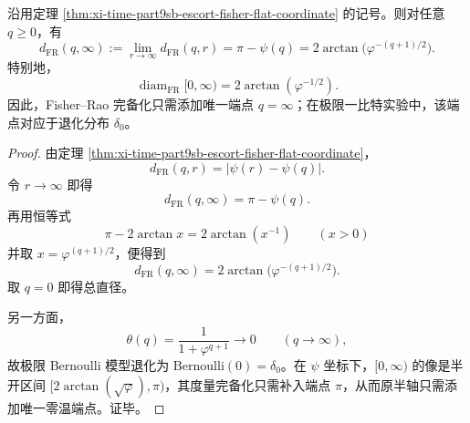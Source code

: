 \begin{corollary}\label{cor:xi-time-part9sb-escort-fisher-completion-zero-endpoint}
沿用定理 \ref{thm:xi-time-part9sb-escort-fisher-flat-coordinate} 的记号。则对任意 \(q\ge 0\)，有
\[
d_{\mathrm{FR}}(q,\infty)
:=
\lim_{r\to\infty}d_{\mathrm{FR}}(q,r)
=
\pi-\psi(q)
=
2\arctan\!\bigl(\varphi^{-(q+1)/2}\bigr).
\]
特别地，
\[
\operatorname{diam}_{\mathrm{FR}}[0,\infty)
=
2\arctan(\varphi^{-1/2}).
\]
因此，Fisher--Rao 完备化只需添加唯一端点 \(q=\infty\)；在极限一比特实验中，该端点对应于退化分布 \(\delta_0\)。
\end{corollary}
\begin{proof}
由定理 \ref{thm:xi-time-part9sb-escort-fisher-flat-coordinate}，
\[
d_{\mathrm{FR}}(q,r)=|\psi(r)-\psi(q)|.
\]
令 \(r\to\infty\) 即得
\[
d_{\mathrm{FR}}(q,\infty)=\pi-\psi(q).
\]
再用恒等式
\[
\pi-2\arctan x=2\arctan(x^{-1})
\qquad (x>0)
\]
并取 \(x=\varphi^{(q+1)/2}\)，便得到
\[
d_{\mathrm{FR}}(q,\infty)=2\arctan\!\bigl(\varphi^{-(q+1)/2}\bigr).
\]
取 \(q=0\) 即得总直径。

另一方面，
\[
\theta(q)=\frac{1}{1+\varphi^{q+1}}\longrightarrow 0
\qquad (q\to\infty),
\]
故极限 Bernoulli 模型退化为 \(\mathrm{Bernoulli}(0)=\delta_0\)。在 \(\psi\) 坐标下，\([0,\infty)\) 的像是半开区间 \([2\arctan(\sqrt\varphi),\pi)\)，其度量完备化只需补入端点 \(\pi\)，从而原半轴只需添加唯一零温端点。证毕。
\end{proof}

